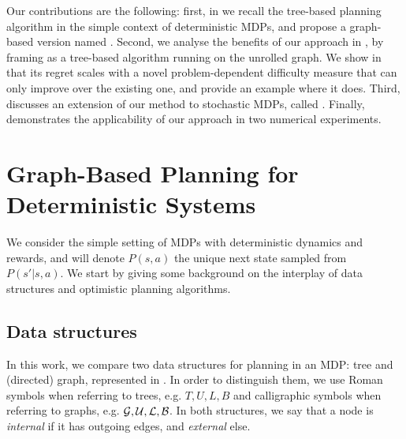 \documentclass[runningheads]{llncs}
\begin{document}
Our contributions are the following: first, in  we recall the \OPD tree-based planning algorithm in the simple context of deterministic MDPs, and propose a graph-based version named \GBOPD. Second, we analyse the benefits of our approach in , by framing \GBOPD as a tree-based algorithm running on the unrolled graph. We show in  that its regret scales with a novel problem-dependent difficulty measure that can only improve over the existing one, and provide an example where it does. Third,  discusses an extension of our method to stochastic MDPs, called \GBOP. Finally,  demonstrates the applicability of our approach in two numerical experiments.

\section{Graph-Based Planning for Deterministic Systems}
\label{sec:gbopd}

We consider the simple setting of MDPs with deterministic dynamics and rewards, and will denote $P(s,a)$ the unique next state sampled from $P\left(s'|s,a\right)$.
We start by giving some background on the interplay of data structures and optimistic planning algorithms.

\subsection{Data structures}

In this work, we compare two data structures for planning in an MDP: tree and (directed) graph, represented in . In order to distinguish them, we use Roman symbols when referring to trees, e.g. $T, U, L, B$ and calligraphic symbols when referring to graphs, e.g. $\mathcal{G}, \mathcal{U}, \mathcal{L}, \mathcal{B}$. In both structures, we say that a node is \emph{internal} if it has outgoing edges, and \emph{external} else.
\end{document}

